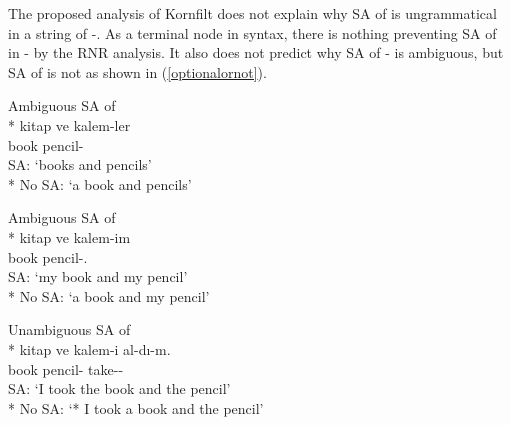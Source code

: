 The proposed analysis of Kornfilt does not explain why SA of {\Poss} is ungrammatical in a string of {\Pl-\Poss}. As a terminal node in syntax, there is nothing preventing SA of {\Poss} in {\Pl-\Poss} by the RNR analysis. It also does not predict why SA of {\Pl-\Poss} is ambiguous, but SA of {\Case} is not as shown in (\ref{optionalornot}).

\begin{exe}
    \ex \label{optionalornot} 
    \begin{xlist}
        \ex Ambiguous SA of {\Pl}\\* 
        \gll kitap ve kalem-ler \\ book {\And} pencil-{\Pl} \\
        \glt SA: `books and pencils' \\*
        No SA: `a book and pencils'
        
        \ex Ambiguous SA of {\Poss}\\* 
        \gll kitap ve kalem-im \\ book {\And} pencil-{\Poss}.{\Fsg} \\
        \glt SA: `my book and my pencil' \\*
        \glt No SA: `a book and my pencil'
        
        \ex Unambiguous SA of {\Acc}\\*
        \gll kitap ve kalem-i al-dı-m. \\ book {\And} pencil-{\Acc} take-{\Pst}-{\Fsg} \\
        \glt SA: `I took the book and the pencil' \\*
        No SA: `* I took a book and the pencil'
    \end{xlist}
\end{exe}

